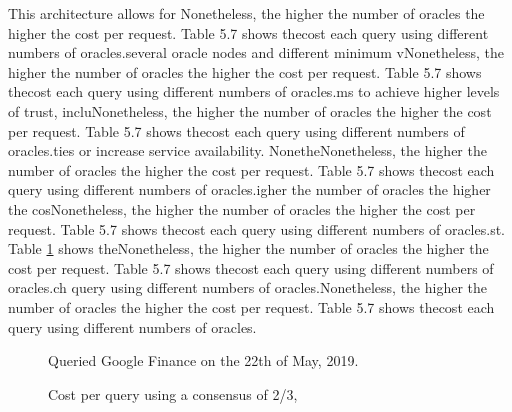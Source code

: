 This architecture allows for Nonetheless, the higher the number of oracles the higher the cost per request. Table 5.7 shows thecost each query using different numbers of oracles.several oracle nodes and different minimum vNonetheless, the higher the number of oracles the higher the cost per request. Table 5.7 shows thecost each query using different numbers of oracles.ms to achieve higher levels of trust, incluNonetheless, the higher the number of oracles the higher the cost per request. Table 5.7 shows thecost each query using different numbers of oracles.ties or increase service availability. NonetheNonetheless, the higher the number of oracles the higher the cost per request. Table 5.7 shows thecost each query using different numbers of oracles.igher the number of oracles the higher the cosNonetheless, the higher the number of oracles the higher the cost per request. Table 5.7 shows thecost each query using different numbers of oracles.st. Table \ref{oracle-query-cost} shows theNonetheless, the higher the number of oracles the higher the cost per request. Table 5.7 shows thecost each query using different numbers of oracles.ch query using different numbers of oracles.Nonetheless, the higher the number of oracles the higher the cost per request. Table 5.7 shows thecost each query using different numbers of oracles.

\begin{figure}[H]
    \centering
    \caption{Cost per query using a consensus of 2/3,}{Queried Google Finance on the 22th of May, 2019.}
    \
    \label{oracle-query-cost}
\end{figure}

